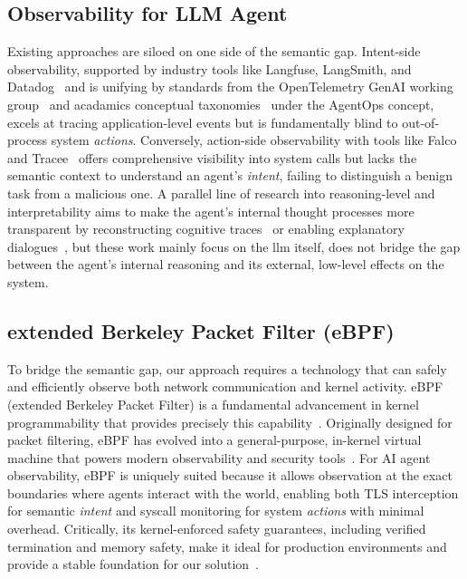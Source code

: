 \subsection{Observability for LLM Agent}

Existing approaches are siloed on one side of the semantic gap. Intent-side observability, supported by industry tools like Langfuse, LangSmith, and Datadog~\cite{Maierhofer2025Langfuse, langfuse, langsmith, Datadog2023Agents, helicone} and is unifying by standards from the OpenTelemetry GenAI working group~\cite{Liu2025OTel,Bandurchin2025Uptrace} and acadamics conceptual taxonomies~\cite{Dong2024AgentOps, Moshkovich2025Pipeline} under the AgentOps concept, excels at tracing application-level events but is fundamentally blind to out-of-process system \emph{actions}. Conversely, action-side observability with tools like Falco and Tracee~\cite{falco, tracee} offers comprehensive visibility into system calls but lacks the semantic context to understand an agent's \emph{intent}, failing to distinguish a benign task from a malicious one. A parallel line of research into reasoning-level and interpretability aims to make the agent's internal thought processes more transparent by reconstructing cognitive traces~\cite{Rombaut2025Watson} or enabling explanatory dialogues~\cite{Kim2025AgenticInterp}, but these work mainly focus on the llm itself, does not bridge the gap between the agent's internal reasoning and its external, low-level effects on the system.

\subsection{extended Berkeley Packet Filter (eBPF)}

To bridge the semantic gap, our approach requires a technology that can safely and efficiently observe both network communication and kernel activity. eBPF (extended Berkeley Packet Filter) is a fundamental advancement in kernel programmability that provides precisely this capability~\cite{brendangregg}. Originally designed for packet filtering, eBPF has evolved into a general-purpose, in-kernel virtual machine that powers modern observability and security tools~\cite{ebpfio,cilium}. For AI agent observability, eBPF is uniquely suited because it allows observation at the exact boundaries where agents interact with the world, enabling both TLS interception for semantic \emph{intent} and syscall monitoring for system \emph{actions} with minimal overhead. Critically, its kernel-enforced safety guarantees, including verified termination and memory safety, make it ideal for production environments and provide a stable foundation for our solution~\cite{kerneldoc}.


